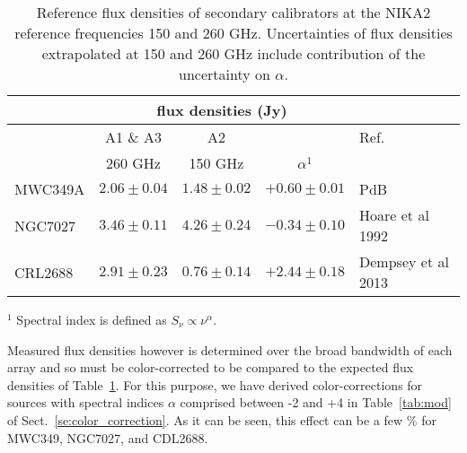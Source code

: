 \begin{table}[h]
\begin{center}    
  \begin{threeparttable}

\begin{tabular}{|l|c|c|c|l|}
\hline
\multicolumn{1}{|c}{}  & \multicolumn{3}{|c}{flux  densities (Jy)} & \multicolumn{1}{|c|}{}  \\
\hline
         &    A1 \& A3       &  A2             &          &   Ref. \\
         &  260 GHz           &  150 GHz         & $\alpha^1$ &      \\
\hline
MWC349A   &   $2.06\pm0.04$  &  $1.48\pm0.02$ &  $+0.60\pm0.01$      &  PdB \cite{krips}    \\
NGC7027  &   $3.46\pm0.11$   &  $4.26\pm0.24$  &  $-0.34\pm0.10$     &  Hoare et al 1992 \cite{Hoare}      \\
CRL2688  &   $2.91\pm0.23$   &  $0.76\pm0.14$  &  $+2.44\pm0.18$     &  Dempsey et al 2013  \cite{Dempsey} \\
\hline
\end{tabular}
  \begin{tablenotes}
{\small     
  \item[$^1$]  Spectral index is defined as $S_{\nu} \propto \nu^{\alpha}$. 
}
  \end{tablenotes}
\end{threeparttable}
\caption[Reference flux densities of secondary calibrators]{Reference flux densities of secondary calibrators at the NIKA2 reference frequencies 150 and 260 GHz. Uncertainties of flux densities extrapolated
at 150 and 260 GHz include contribution of the uncertainty on $\alpha$.}
\label{tab:flux_ref_sec}
\end{center}
\end{table}


Measured flux densities however is determined over the broad
bandwidth of each array and so must be color-corrected to be compared
to the expected flux densities of Table~\ref{tab:flux_ref_sec}.  For
this purpose, we have derived color-corrections for sources with spectral
indices $\alpha$ comprised between -2 and +4 in Table~\ref{tab:mod} of
Sect.~\ref{se:color_correction}. %
As it can be seen, this effect can be a few \% for MWC349, NGC7027, and CDL2688.
